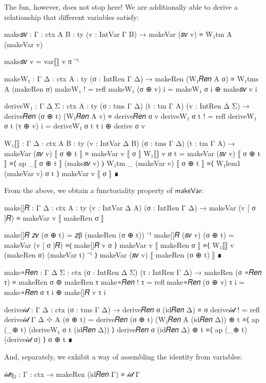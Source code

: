 The fun, however, does not stop here! We are additionally able to derive a
relationship that different variables satisfy:
\begin{code}
  make𝑠𝑣 : {Γ : ctx} {A B : ty} (v : IntVar Γ B) →
    makeVar (𝑠𝑣 v) ≡ W₁tm A (makeVar v)
\end{code}
\begin{code}[hide]
  make𝑠𝑣 v = var⟦⟧ v π ⁻¹

  makeW₁ : {Γ Δ : ctx} {A : ty} (σ : IntRen Γ Δ) →
    makeRen (W₁𝑅𝑒𝑛 A σ) ≡ W₁tms A (makeRen σ)
  makeW₁ ! = refl
  makeW₁ (σ ⊕ v) i = makeW₁ σ i ⊕ make𝑠𝑣 v i

  deriveW₁ : {Γ Δ Σ : ctx} {A : ty} (σ : tms Γ Δ) (t : tm Γ A) (v : IntRen Δ Σ) →
    derive𝑅𝑒𝑛 (σ ⊕ t) (W₁𝑅𝑒𝑛 A v) ≡ derive𝑅𝑒𝑛 σ v
  deriveW₁ σ t ! = refl
  deriveW₁ σ t (τ ⊕ v) i = deriveW₁ σ t τ i ⊕ derive σ v

  W₁⟦⟧ : {Γ Δ : ctx} {A B : ty} (v : IntVar Δ B) (σ : tms Γ Δ) (t : tm Γ A) →
    makeVar (𝑠𝑣 v) ⟦ σ ⊕ t ⟧ ≡ makeVar v ⟦ σ ⟧
  W₁⟦⟧ v σ t =
    makeVar (𝑠𝑣 v) ⟦ σ ⊕ t ⟧
      ≡⟨ ap _⟦ σ ⊕ t ⟧ (make𝑠𝑣 v) ⟩
    W₁tm _ (makeVar v) ⟦ σ ⊕ t ⟧
      ≡⟨ W₁lem1 (makeVar v) σ t ⟩
    makeVar v ⟦ σ ⟧
      ∎
\end{code}
\noindent
From the above, we obtain a functoriality property of $\mathsf{makeVar}$:
\begin{code}
  make[]𝑅 : {Γ Δ : ctx} {A : ty} (v : IntVar Δ A) (σ : IntRen Γ Δ) →
    makeVar (v [ σ ]𝑅) ≡ makeVar v ⟦ makeRen σ ⟧
\end{code}
\begin{code}[hide]
  make[]𝑅 𝑧𝑣 (σ ⊕ t) = 𝑧β (makeRen (σ ⊕ t)) ⁻¹
  make[]𝑅 (𝑠𝑣 v) (σ ⊕ t) =
    makeVar (v [ σ ]𝑅)
      ≡⟨ make[]𝑅 v σ ⟩
    makeVar v ⟦ makeRen σ ⟧
      ≡⟨ W₁⟦⟧ v (makeRen σ) (makeVar t) ⁻¹ ⟩
    makeVar (𝑠𝑣 v) ⟦ makeRen (σ ⊕ t) ⟧
      ∎

  make∘𝑅𝑒𝑛 : {Γ Δ Σ : ctx} (σ : IntRen Δ Σ) (τ : IntRen Γ Δ) →
    makeRen (σ ∘𝑅𝑒𝑛 τ) ≡ makeRen σ ⊚ makeRen τ
  make∘𝑅𝑒𝑛 ! τ = refl
  make∘𝑅𝑒𝑛 (σ ⊕ v) τ i = make∘𝑅𝑒𝑛 σ τ i ⊕ make[]𝑅 v τ i

  derive𝒾𝒹 : {Γ Δ : ctx} (σ : tms Γ Δ) →
    derive𝑅𝑒𝑛 σ (id𝑅𝑒𝑛 Δ) ≡ σ
  derive𝒾𝒹 ! = refl
  derive𝒾𝒹 {Γ} {Δ ⊹ A} (σ ⊕ t) =
    derive𝑅𝑒𝑛 (σ ⊕ t) (W₁𝑅𝑒𝑛 A (id𝑅𝑒𝑛 Δ)) ⊕ t
      ≡⟨ ap (_⊕ t) (deriveW₁ σ t (id𝑅𝑒𝑛 Δ)) ⟩
    derive𝑅𝑒𝑛 σ (id𝑅𝑒𝑛 Δ) ⊕ t
      ≡⟨ ap (_⊕ t) (derive𝒾𝒹 σ) ⟩
    σ ⊕ t
      ∎
\end{code}
\noindent
And, separately, we exhibit a way of assembling the identity from variables:
\begin{code}
  𝒾𝒹η₂ : {Γ : ctx} → makeRen (id𝑅𝑒𝑛 Γ) ≡ 𝒾𝒹 Γ
\end{code}
